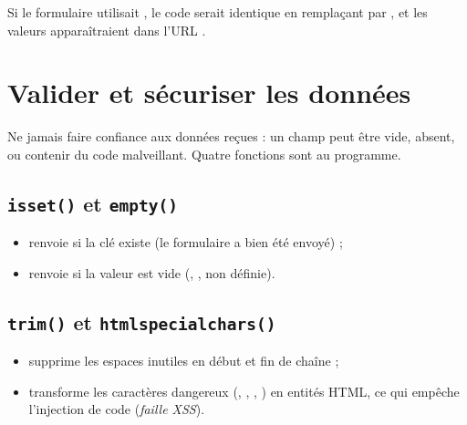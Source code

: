 
\begin{remarque}
Si le formulaire utilisait , le code serait identique en
remplaçant  par , et les valeurs apparaîtraient dans
l'URL .
\end{remarque}

\section{Valider et sécuriser les données}

Ne jamais faire confiance aux données reçues : un champ peut être vide, absent,
ou contenir du code malveillant. Quatre fonctions sont au programme.

\subsection{\texttt{isset()} et \texttt{empty()}}

\begin{itemize}
  \item {} renvoie  si la clé existe
        (le formulaire a bien été envoyé) ;
  \item {} renvoie  si la valeur est
        vide (, , non définie).
\end{itemize}


\subsection{\texttt{trim()} et \texttt{htmlspecialchars()}}

\begin{itemize}
  \item {} supprime les espaces inutiles en début et fin de
        chaîne ;
  \item {} transforme les caractères
        dangereux (\code{<}, \code{>}, \code{\&}, ) en entités HTML, ce
        qui empêche l'injection de code (\emph{faille XSS}).
\end{itemize}

